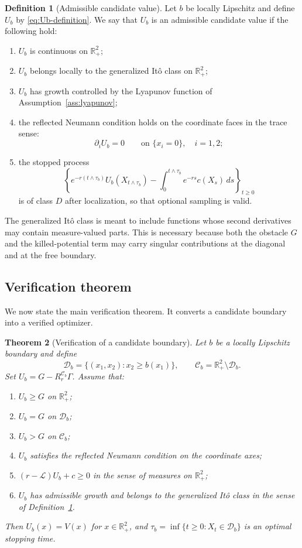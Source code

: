 \documentclass[pdflatex,sn-mathphys-num]{sn-jnl}
\theoremstyle{plain}
\newtheorem{theorem}{Theorem}[section]
\theoremstyle{definition}
\newtheorem{definition}[theorem]{Definition}
\theoremstyle{remark}
\numberwithin{equation}{section}
\begin{document}
\begin{definition}[Admissible candidate value] \label{def:admissible-candidate-value} 
Let \(b\) be locally Lipschitz and define \(U_b\) by \eqref{eq:Ub-definition}. We say that \(U_b\) is an admissible candidate value if the following hold: 
\begin{enumerate}[label=(\roman*)] 
\item \(U_b\) is continuous on \(\mathbb R_+^2\); 
\item \(U_b\) belongs locally to the generalized It\^{o} class on \(\mathbb R_+^2\); 
\item \(U_b\) has growth controlled by the Lyapunov function of Assumption~\ref{ass:lyapunov}; 
\item the reflected Neumann condition holds on the coordinate faces in the trace sense: 
\[ 
\partial_i U_b=0 \qquad\text{on }\{x_i=0\},\quad i=1,2; 
\] 
\item the stopped process \[ \left\{ e^{-r(t\wedge\tau_b)}U_b(X_{t\wedge\tau_b}) - \int_0^{t\wedge\tau_b}e^{-rs}c(X_s)\,ds \right\}_{t\ge0} \] is of class \(D\) after localization, so that optional sampling is valid. \end{enumerate} 
\end{definition} 
The generalized It\^{o} class is meant to include functions whose second derivatives may contain measure-valued parts. This is necessary because both the obstacle \(G\) and the killed-potential term may carry singular contributions at the diagonal and at the free boundary. 

\subsection{Verification theorem} \label{subsec:verification-theorem} 

We now state the main verification theorem. It converts a candidate boundary into a verified optimizer. \begin{theorem}[Verification of a candidate boundary] \label{thm:verification-boundary} Let \(b\) be a locally Lipschitz boundary and define 
\[ \mathcal D_b=\{(x_1,x_2):x_2\ge b(x_1)\}, \qquad \mathcal C_b=\mathbb R_+^2\setminus\mathcal D_b. \] 
Set 
$\displaystyle U_b=G-R_r^{\mathcal C_b}\Gamma$.  
Assume that: 
\begin{enumerate}[label=(\roman*)]
\item \(U_b\ge G\) on \(\mathbb R_+^2\); 
\item \(U_b=G\) on \(\mathcal D_b\); 
\item \(U_b>G\) on \(\mathcal C_b\); 
\item \(U_b\) satisfies the reflected Neumann condition on the coordinate axes; 
\item \((r-\mathcal L)U_b+c\ge0\) in the sense of measures on \(\mathbb R_+^2\); 
\item \(U_b\) has admissible growth and belongs to the generalized It\^{o} class in the sense of Definition~\ref{def:admissible-candidate-value}. 
\end{enumerate} 
Then 
$U_b(x)=V(x)$ for $x\in\mathbb R_+^2$, 
and 
$\tau_b=\inf\{t\ge0:X_t\in\mathcal D_b\}$ 
is an optimal stopping time. 
\end{theorem} 
\end{document}
